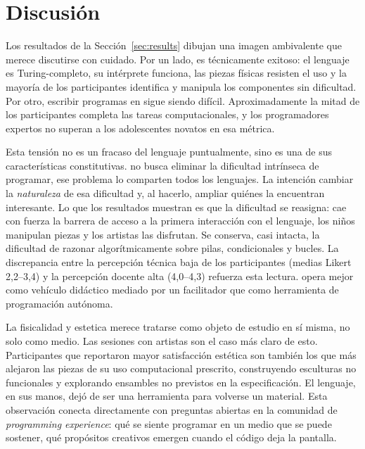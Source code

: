 
\section{Discusi\'on}
\label{sec:discussion}

Los resultados de la Secci\'on~\ref{sec:results} dibujan una imagen ambivalente
que merece discutirse con cuidado. Por un lado, \sculpt es t\'ecnicamente
exitoso: el lenguaje es Turing-completo, su int\'erprete funciona, las
piezas f\'isicas resisten el uso y la mayor\'ia de los participantes
identifica y manipula los componentes sin dificultad. Por otro,
escribir programas en \sculpt sigue siendo dif\'icil. Aproximadamente
la mitad de los participantes completa las tareas computacionales,
y los programadores expertos no superan a los adolescentes novatos
en esa m\'etrica.

Esta tensi\'on no es un fracaso del lenguaje puntualmente, sino es una de sus
caracter\'isticas constitutivas. \sculpt no busca eliminar la
dificultad intr\'inseca de programar, ese problema lo comparten todos
los lenguajes. La intenci\'on cambiar la \emph{naturaleza} de esa dificultad y,
al hacerlo, ampliar qui\'enes la encuentran interesante. Lo que los
resultados muestran es que la dificultad se reasigna: cae con fuerza la
barrera de acceso a la primera interacci\'on con el lenguaje, los
ni\~nos manipulan piezas y los artistas las disfrutan. Se conserva,
casi intacta, la dificultad de razonar algor\'itmicamente sobre pilas, condicionales y bucles.
La discrepancia entre la percepci\'on t\'ecnica baja de los
participantes (medias Likert 2{,}2--3{,}4) y la percepci\'on docente
alta (4{,}0--4{,}3) refuerza esta lectura. \sculpt opera mejor como
veh\'iculo did\'actico mediado por un facilitador que como herramienta
de programaci\'on aut\'onoma.

La fisicalidad y estetica merece tratarse como objeto de estudio en s\'i misma, no
solo como medio. Las sesiones con artistas son el caso m\'as claro de esto.
Participantes que reportaron mayor satisfacci\'on est\'etica son
tambi\'en los que m\'as alejaron las piezas de su uso computacional
prescrito, construyendo esculturas no funcionales y explorando
ensambles no previstos en la especificaci\'on. El lenguaje, en sus
manos, dej\'o de ser una herramienta para volverse un material. Esta
observaci\'on conecta directamente con preguntas abiertas en la
comunidad de \emph{programming experience}: qu\'e se siente programar
en un medio que se puede sostener, qu\'e prop\'ositos creativos
emergen cuando el c\'odigo deja la pantalla.

